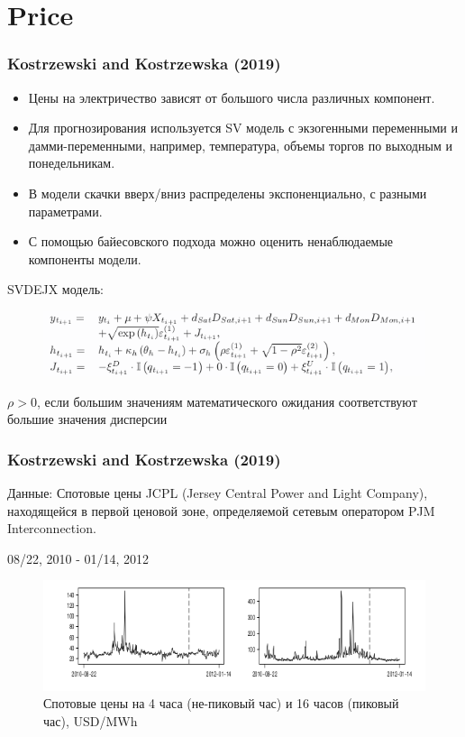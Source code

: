 \documentclass[c, dvipsnames]{beamer}  %
\begin{document}
\section{Price}




\begin{frame}[shrink=5]
\frametitle{Kostrzewski and Kostrzewska (2019)} 

\begin{itemize}
	\item Цены на электричество зависят от большого числа различных компонент.

\item  Для прогнозирования используется SV модель с экзогенными переменными и дамми-переменными, например, температура, объемы торгов по выходным и понедельникам.

\item  В модели скачки вверх/вниз распределены экспоненциально, с разными параметрами.
\item  С помощью байесовского подхода можно оценить ненаблюдаемые компоненты модели.

\end{itemize}
SVDEJX модель: 

\begin{figure}
	\centering
	\includegraphics[width=0.7\linewidth]{screenshot005}
	\label{fig:screenshot005}
\end{figure}

$\rho > 0$, если большим значениям математического ожидания соответствуют большие значения дисперсии 


\end{frame}


\begin{frame}[shrink=5]
\frametitle{Kostrzewski and Kostrzewska (2019)} 

Данные: Спотовые цены JCPL (Jersey Central Power and Light Company), находящейся   в первой  ценовой зоне, определяемой сетевым оператором PJM Interconnection.

08/22, 2010 -  01/14, 2012

\begin{figure}
	\centering
	\includegraphics[width=0.7\linewidth]{screenshot012}
	\caption{Спотовые цены на 4 часа (не-пиковый час) и 16 часов (пиковый час), USD/MWh }
	\label{fig:screenshot006}
\end{figure}



\end{frame}
\end{document}
